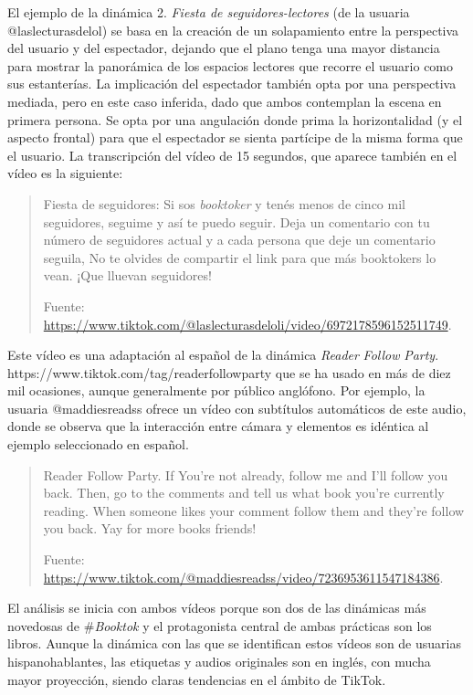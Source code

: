 El ejemplo de la dinámica 2. \emph{Fiesta de seguidores-lectores} (de la
usuaria @laslecturasdelol) se basa en la creación de un solapamiento
entre la perspectiva del usuario y del espectador, dejando que el plano
tenga una mayor distancia para mostrar la panorámica de los espacios
lectores que recorre el usuario como sus estanterías. La implicación del
espectador también opta por una perspectiva mediada, pero en este caso
inferida, dado que ambos contemplan la escena en primera persona. Se
opta por una angulación donde prima la horizontalidad (y el aspecto
frontal) para que el espectador se sienta partícipe de la misma forma
que el usuario. La transcripción del vídeo de 15 segundos, que aparece
también en el vídeo es la siguiente:
\begin{quote}
		Fiesta de seguidores: Si sos \emph{booktoker} y tenés menos de cinco mil
		seguidores, seguime y así te puedo seguir. Deja un comentario con tu
		número de seguidores actual y a cada persona que deje un comentario
		seguila, No te olvides de compartir el link para que más booktokers lo
		vean. ¡Que lluevan seguidores!
		
		Fuente:
		\url{https://www.tiktok.com/@laslecturasdeloli/video/6972178596152511749}.
\end{quote}

Este vídeo es una adaptación al español de la dinámica \emph{Reader}
\emph{Follow} \emph{Party}. https://www.tiktok.com/tag/readerfollowparty
que se ha usado en más de diez mil ocasiones, aunque generalmente por
público anglófono. Por ejemplo, la usuaria @maddiesreadss ofrece un
vídeo con subtítulos automáticos de este audio, donde se observa que la
interacción entre cámara y elementos es idéntica al ejemplo seleccionado
en español.

\begin{quote}
	Reader Follow Party. If You're not already, follow me and I'll follow
	you back. Then, go to the comments and tell us what book you're
	currently reading. When someone likes your comment follow them and
	they're follow you back. Yay for more books friends!
	
	Fuente:
	\url{https://www.tiktok.com/@maddiesreadss/video/7236953611547184386}.
\end{quote}


El análisis se inicia con ambos vídeos porque son dos de las dinámicas
más novedosas de \#\emph{Booktok} y el protagonista central de ambas
prácticas son los libros. Aunque la dinámica con las que se identifican
estos vídeos son de usuarias hispanohablantes, las etiquetas y audios
originales son en inglés, con mucha mayor proyección, siendo claras
tendencias en el ámbito de TikTok.

